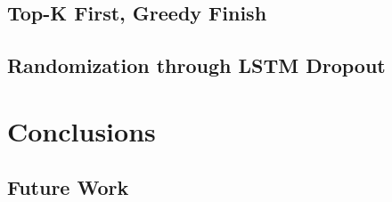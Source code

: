 \documentclass{article}
\begin{document}
\subsection{Top-K First, Greedy Finish}

\subsection{Randomization through LSTM Dropout}

\section{Conclusions}

\subsection{Future Work}



\end{document}
